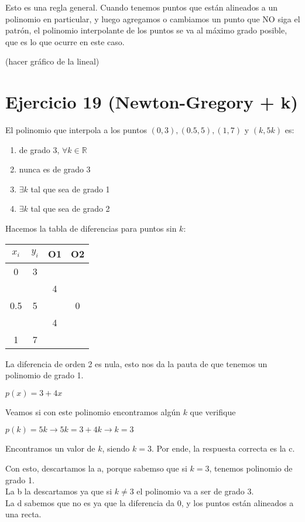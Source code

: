 \documentclass[11pt]{article}
\begin{document}
	Esto es una regla general. Cuando tenemos puntos que están alineados a un polinomio en particular, y luego agregamos o cambiamos un punto que NO siga el patrón, el polinomio interpolante de los puntos se va al máximo grado posible, que es lo que ocurre en este caso.
	
	(hacer gráfico de la lineal)
	
	\section{Ejercicio 19 (Newton-Gregory + k)}
	El polinomio que interpola a los puntos $(0,3),(0.5,5),(1,7)$ y $(k, 5k)$ es:
	
	\begin{enumerate}[label=\alph*)]
		\item de grado 3, $\forall k \in \mathbb{R}$
		\item nunca es de grado 3
		\item $\exists k$ tal que sea de grado 1
		\item $\exists k$ tal que sea de grado 2
	\end{enumerate}

	Hacemos la tabla de diferencias para puntos sin $k$:
	
	\begin{tabular}{|c c c c|}
		\hline
		$x_i$ & $y_i$ & O1 & O2\\
		\hline
		0 & 3 & & \\
		& & 4 & \\
		0.5  & 5  & &0 \\
		& & 4 & \\
		1  & 7 & & \\
		\hline
	\end{tabular}

	La diferencia de orden 2 es nula, esto nos da la pauta de que tenemos un polinomio de grado 1.
	
	$p(x)=3+4x$
	
	Veamos si con este polinomio encontramos algún $k$ que verifique
	
	$p(k)=5k \rightarrow 5k=3+4k \rightarrow k=3$
	
	Encontramos un valor de $k$, siendo $k=3$. Por ende, la respuesta correcta es la c.
	
	Con esto, descartamos la a, porque sabemso que si $k=3$, tenemos polinomio de grado 1.\\
	La b la descartamos ya que si $k\ne3$ el polinomio va a ser de grado 3.\\
	La d sabemos que no es ya que la diferencia da 0, y los puntos están alineados a una recta.
\end{document}
